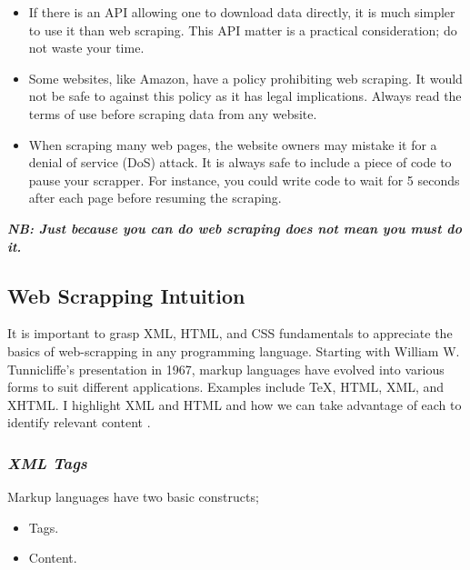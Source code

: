 \documentclass[]{tufte-handout}
\providecommand{\tightlist}{%
  \setlength{\itemsep}{0pt}\setlength{\parskip}{0pt}}
\begin{document}
\begin{itemize}
\tightlist
\item
  If there is an API allowing one to download data directly, it is much
  simpler to use it than web scraping. This API matter is a practical
  consideration; do not waste your time.
\item
  Some websites, like Amazon, have a policy prohibiting web scraping. It
  would not be safe to against this policy as it has legal implications.
  Always read the terms of use before scraping data from any website.
\item
  When scraping many web pages, the website owners may mistake it for a
  denial of service (DoS) attack. It is always safe to include a piece
  of code to pause your scrapper. For instance, you could write code to
  wait for 5 seconds after each page before resuming the scraping.
\end{itemize}

\textbf{\emph{NB: Just because you can do web scraping does not mean you
must do it. }}

\hypertarget{web-scrapping-intuition}{%
\subsection{\texorpdfstring{\textbf{Web Scrapping
Intuition}}{Web Scrapping Intuition}}\label{web-scrapping-intuition}}

It is important to grasp XML, HTML, and CSS fundamentals to appreciate
the basics of web-scrapping in any programming language. Starting with
William W. Tunnicliffe's presentation in 1967, markup languages have
evolved into various forms to suit different applications. Examples
include TeX, HTML, XML, and XHTML. I highlight XML and HTML and how we
can take advantage of each to identify relevant content
\citep{ramasubramanian2017machine}.

\hypertarget{xml-tags}{%
\subsubsection{\texorpdfstring{\textbf{\emph{XML
Tags}}}{XML Tags}}\label{xml-tags}}

Markup languages have two basic constructs;

\begin{itemize}
\tightlist
\item
  Tags.
\item
  Content.
\end{itemize}
\end{document}
